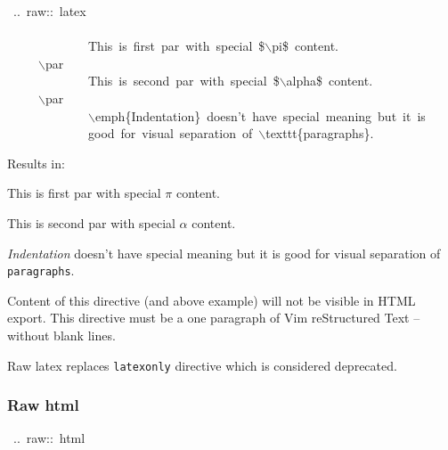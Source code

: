 \documentclass[12pt]{article}
\begin{document}
\begin{ttfamily}\begin{flushleft}
\mbox{~..~raw::~latex}\\
\mbox{}\\
\mbox{~~~~~~~~~~~~~This~is~first~par~with~special~\$$\backslash$pi\$~content.}\\
\mbox{~~~~~$\backslash$par}\\
\mbox{~~~~~~~~~~~~~This~is~second~par~with~special~\$$\backslash$alpha\$~content.}\\
\mbox{~~~~~$\backslash$par}\\
\mbox{~~~~~~~~~~~~~$\backslash$emph\{Indentation\}~doesn't~have~special~meaning~but~it~is}\\
\mbox{~~~~~~~~~~~~~good~for~visual~separation~of~$\backslash$texttt\{paragraphs\}.}\\
\end{flushleft}\end{ttfamily}

Results in:

This is first par with special $\pi$ content.
\par
This is second par with special $\alpha$ content.
\par
\emph{Indentation} doesn't have special meaning but it is
good for visual separation of \texttt{paragraphs}.

Content of this directive (and above example) will not be visible in HTML
export. This directive must be a one paragraph of Vim reStructured Text -- without blank lines.

Raw latex replaces \texttt{latexonly} directive which is considered deprecated.

\hypertarget{lraw-html}{}
\subsubsection{Raw html}

\begin{ttfamily}\begin{flushleft}
\mbox{~..~raw::~html}\\
\end{flushleft}\end{ttfamily}
\end{document}
